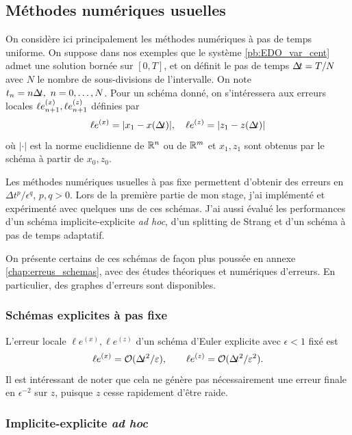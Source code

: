\subsection{Méthodes numériques usuelles} \label{subsec:meth_num_usuelles}

On considère ici principalement les méthodes numériques à pas de temps uniforme. 
On suppose dans nos exemples que le système \eqref{pb:EDO_var_cent} admet une solution bornée sur $[0,T]$, et on définit le pas de temps $\Delta\!\!\!\ t = T/N$ avec $N$ le nombre de sous-divisions de l'intervalle. On note $t_n = n\Delta\!\!\!\ t,\ n=0,\ldots,N$. 
Pour un schéma donné, on s'intéressera aux erreurs locales $\ell e^{(x)}_{n+1}, \ell e^{(z)}_{n+1}$ définies par 
$$ \ell e^{(x)} = |x_1 - x(\Delta\!\!\!\ t)|, \quad \ell e^{(z)} = |z_1 - z(\Delta\!\!\!\ t)| $$
où $|\cdot|$ est la norme euclidienne de $\mathbb{R}^n$ ou de $\mathbb{R}^m$ et $x_1,z_1$ sont obtenus par le schéma à partir de $x_0,z_0$. 

Les méthodes numériques usuelles à pas fixe permettent d'obtenir des erreurs en $\Delta t^p/\epsilon^q$, $p,q > 0$. 
Lors de la première partie de mon stage, j'ai implémenté et expérimenté avec quelques uns de ces schémas. 
J'ai aussi évalué les performances d'un schéma implicite-explicite \textit{ad hoc}, d'un splitting de Strang et d'un schéma à pas de temps adaptatif. 

On présente certains de ces schémas de façon plus poussée en annexe \ref{chap:erreus_schemas}, avec des études théoriques et numériques d'erreurs. 
En particulier, des graphes d'erreurs sont disponibles. 

\subsubsection{Schémas explicites à pas fixe}

L'erreur locale $\ell e^{(x)}, \ell e^{(z)}$ d'un schéma d'Euler explicite avec $\epsilon < 1$ fixé est 
$$ \ell e^{(x)} = \mathcal{O}(\Delta\!\!\!\ t^2/\varepsilon), \qquad \ell e^{(z)} = \mathcal{O}(\Delta\!\!\!\ t^2/\varepsilon^2). $$ 
Il est intéressant de noter que cela ne génère pas nécessairement une erreur finale en $\epsilon^{-2}$ sur $z$, puisque $z$ cesse rapidement d'être raide. 

\subsubsection{Implicite-explicite \textit{ad hoc}}

